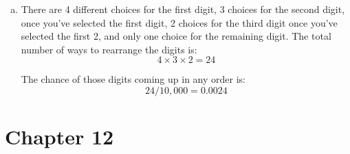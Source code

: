 \documentclass[letterpaper, landscape]{exam}
\begin{document}
\begin{description}
\begin{enumerate}[(a)]
            \item There are 4 different choices for the first digit, 3 choices
              for the second digit, once you've selected the first digit, 2
              choices for the third digit once you've selected the first 2, and
              only one choice for the remaining digit. The total number of ways
              to rearrange the digits is:
              \[
                4 \times 3 \times 2 = 24
              \]

              The chance of those digits coming up in any order is:
              \[
                24 / 10,000 = \boxed{ 0.0024 }
              \]
          \end{enumerate}

  \end{description}

  \section{Chapter 12} %
  
\end{document}
